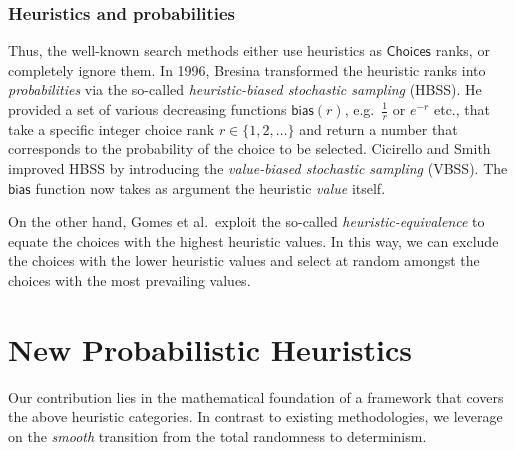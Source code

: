 \documentclass{ws-ijait}
\begin{document}
\subsubsection{Heuristics and probabilities}

Thus, the well-known search methods either use heuristics as
$\mathsf{Choices}$ ranks, or completely ignore them. In
1996, Bresina transformed the heuristic ranks into
\emph{probabilities} via the so-called
\emph{heuristic-biased stochastic sampling}
(HBSS).\cite{bresina-hbss} He provided a set of various
decreasing functions $\mathsf{bias}(r)$, e.g.\ $\frac{1}{r}$
or $e^{-r}$ etc., that take a specific integer choice rank
$r \in \{1, 2, \ldots\}$ and return a number that
corresponds to the probability of the choice to be selected.
Cicirello and Smith improved HBSS by introducing the
\emph{value-biased stochastic sampling} (VBSS). The
$\mathsf{bias}$ function now takes as argument the heuristic
\emph{value} itself.\cite{cicirello-vbss}

On the other hand, Gomes et al.\ exploit the so-called
\emph{heuristic-equivalence} to equate the choices with the
highest heuristic values. In this way, we can exclude the
choices with the lower heuristic values and select at random
amongst the choices with the most prevailing
values.\cite{equivalence}


\section{New Probabilistic Heuristics}

Our contribution lies in the mathematical foundation of a
framework that covers the above heuristic categories. In
contrast to existing methodologies, we leverage on the
\emph{smooth} transition from the total randomness to
determinism.
\end{document}
